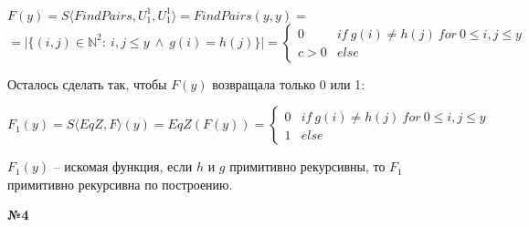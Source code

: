 \documentclass{article}
\newenvironment{task}{\begin{center}\fontsize{14}{14}\selectfont\bf}{\rm\fontsize{12}{12}\selectfont\end{center}}
\begin{document}
\begin{spacing}{1.4}
\begin{center}
		$F(y) = S \langle FindPairs, U_1^1, U_1^1 \rangle = FindPairs(y, y) =$\\$= \lvert\{ (i, j) \in \mathbb{N}^2 : \ i,j \leq y \ \wedge  \ g(i) = h(j) \}\rvert = \begin{cases}
		0 & if \ g(i) \not = h(j)\ for\ 0 \leq i, j \leq y \\
		c > 0 & else
		\end{cases}$
	\end{center}
	Осталось сделать так, чтобы $F(y)$ возвращала только 0 или 1: 
	\begin{center}
	$F_1(y) = S\langle EqZ, F \rangle (y) = EqZ(F(y)) =  \begin{cases}
	0 & if \ g(i) \not = h(j)\ for\ 0 \leq i, j \leq y \\
	1 & else
	\end{cases}$ 
	\end{center}
	$F_1(y)$ -- искомая функция, если $h$ и $g$ примитивно рекурсивны, то $F_1$ примитивно рекурсивна по построению. 
 	\end{spacing}
	
		
	\begin{task} 
		№4
	\end{task}
\end{document}
